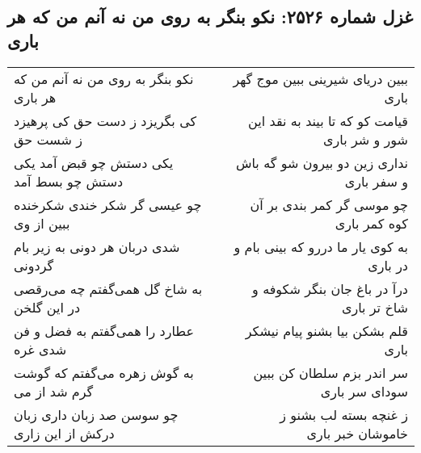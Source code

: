 \begin{center}
\section*{غزل شماره ۲۵۲۶: نکو بنگر به روی من نه آنم من که هر باری}
\label{sec:2526}
\begin{longtable}{l p{0.5cm} r}
نکو بنگر به روی من نه آنم من که هر باری
&&
ببین دریای شیرینی ببین موج گهر باری
\\
کی بگریزد ز دست حق کی پرهیزد ز شست حق
&&
قیامت کو که تا بیند به نقد این شور و شر باری
\\
یکی دستش چو قبض آمد یکی دستش چو بسط آمد
&&
نداری زین دو بیرون شو گه باش و سفر باری
\\
چو عیسی گر شکر خندی شکرخنده ببین از وی
&&
چو موسی گر کمر بندی بر آن کوه کمر باری
\\
شدی دربان هر دونی به زیر بام گردونی
&&
به کوی یار ما دررو که بینی بام و در باری
\\
به شاخ گل همی‌گفتم چه می‌رقصی در این گلخن
&&
درآ در باغ جان بنگر شکوفه و شاخ تر باری
\\
عطارد را همی‌گفتم به فضل و فن شدی غره
&&
قلم بشکن بیا بشنو پیام نیشکر باری
\\
به گوش زهره می‌گفتم که گوشت گرم شد از می
&&
سر اندر بزم سلطان کن ببین سودای سر باری
\\
چو سوسن صد زبان داری زبان درکش از این زاری
&&
ز غنچه بسته لب بشنو ز خاموشان خبر باری
\\
\end{longtable}
\end{center}

